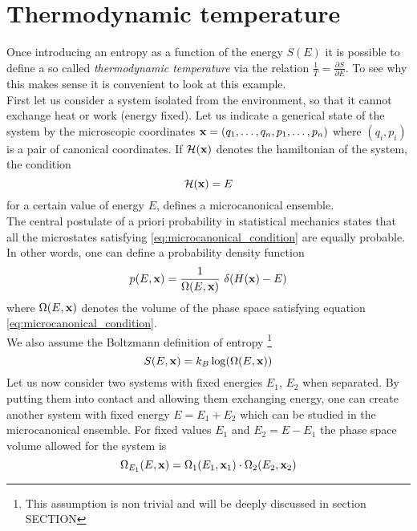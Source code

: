 \section{Thermodynamic temperature}
Once introducing an entropy as a function of the energy $S(E)$ it is possible to define a so called \emph{thermodynamic temperature} via the relation $\frac{1}{T} = \frac{\partial S}{\partial E}$.
To see why this makes sense it is convenient to look at this example. \\
First let us consider a system isolated from the environment, so that it cannot exchange heat or work (energy fixed). Let us indicate a generical
state of the system by the microscopic coordinates $\mathbf{x} = (q_1, \dots, q_n, p_1, \dots, p_n)$ where $(q_i, p_i)$ is a pair of canonical coordinates. If $\mathcal{H}(\mathbf{x})$ denotes the hamiltonian of the system,
the condition
\begin{equation}
    \mathcal{H}(\mathbf{x}) = E
    \label{eq:microcanonical_condition}
\end{equation}    
for a certain value of energy $E$, defines a microcanonical ensemble. \\
The central postulate of a priori probability in statistical mechanics states that all the microstates satisfying \ref{eq:microcanonical_condition} are equally probable. In other words, one can
define a probability density function
\begin{equation*}
    p(E, \mathbf{x}) = \frac{1}{\Omega(E, \mathbf{x})} \ \delta(H(\mathbf{x}) - E)
\end{equation*}
where $\Omega(E, \mathbf{x})$ denotes the volume of the phase space satisfying equation \ref{eq:microcanonical_condition}. \\
We also assume the Boltzmann definition of entropy \footnote{This assumption is non trivial and will be deeply discussed in section SECTION}
\begin{equation}
    S(E, \mathbf{x}) = k_B \log(\Omega(E, \mathbf{x}))
    \label{eq:Boltzmann_entropy}
\end{equation}
Let us now consider two systems with fixed energies $E_1$, $E_2$ when separated. By putting them into contact and allowing them exchanging energy, one can create another system 
with fixed energy $E = E_1 + E_2$ which can be studied in the microcanonical ensemble.
For fixed values $E_1$ and $E_2 = E - E_1$ the phase space volume allowed for the system is 
\begin{equation*} 
    \Omega_{E_1}(E, \mathbf{x}) = \Omega_1(E_1, \mathbf{x}_1) \cdot \Omega_2(E_2, \mathbf{x}_2)
\end{equation*}
